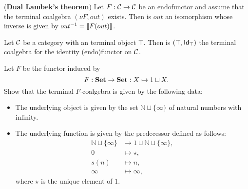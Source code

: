 \begin{exer} (\textbf{Dual Lambek's theorem}) Let $F:\CC\to\CC$ be an endofunctor and assume that the terminal coalgebra $(\nu F, out)$ exists. Then is $out$ an isomorphism whose inverse is given by $\Inv{out} = \anam{F(out)}$.
\end{exer}

\begin{exer}\label{exercise:terminalalg_for_idfun_with_terminalob} Let $\CC$ be a category with an terminal object $\top$. Then is $(\top, \Id[\top])$ the terminal coalgebra for the identity (endo)functor on $\CC$.
\end{exer}

\begin{exer} Let $F$ be the functor induced by 
\[
F:\SET\to\SET : X\mapsto 1 \sqcup X.
\]
Show that the terminal $F$-coalgebra is given by the following data:
\begin{itemize}
\item The underlying object is given by the set $\mathbb{N} \sqcup \{\infty\}$ of natural numbers with infinity.
\item The underlying function is given by the predecessor defined as follows: 
\begin{align*}
\mathbb{N} \sqcup \{\infty\} &\to 1 \sqcup \mathbb{N} \sqcup \{\infty\},\\
0 &\mapsto \star,\\
s(n) &\mapsto n,\\
\infty &\mapsto \infty,
\end{align*}
where $\star$ is the unique element of $1$.
\end{itemize}
\end{exer}



